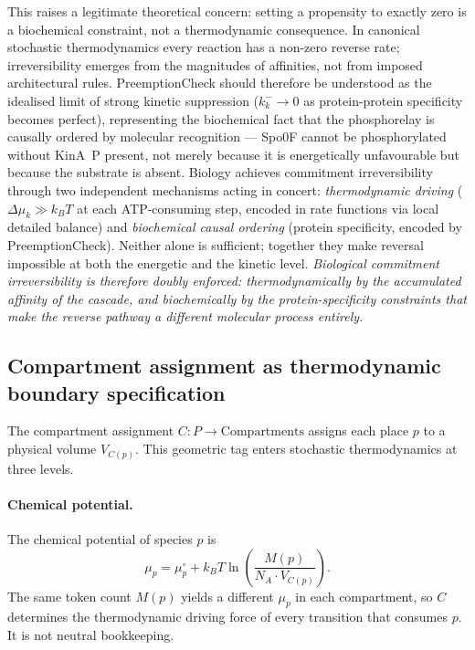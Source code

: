 \documentclass[11pt,a4paper]{article}
\begin{document}
This raises a legitimate theoretical concern: setting a propensity to
exactly zero is a biochemical constraint, not a thermodynamic consequence.
In canonical stochastic thermodynamics every reaction has a non-zero
reverse rate; irreversibility emerges from the magnitudes of affinities,
not from imposed architectural rules.
PreemptionCheck should therefore be understood as the idealised limit of
strong kinetic suppression ($k^-_k \to 0$ as protein-protein specificity
becomes perfect), representing the biochemical fact that the phosphorelay
is causally ordered by molecular recognition --- Spo0F cannot be
phosphorylated without KinA~P present, not merely because it is
energetically unfavourable but because the substrate is absent.
Biology achieves commitment irreversibility through two independent
mechanisms acting in concert: \emph{thermodynamic driving}
($\Delta\mu_k \gg k_BT$ at each ATP-consuming step, encoded in rate
functions via local detailed balance) and \emph{biochemical causal
ordering} (protein specificity, encoded by PreemptionCheck).
Neither alone is sufficient; together they make reversal impossible at
both the energetic and the kinetic level.
\emph{Biological commitment irreversibility is therefore doubly enforced:
thermodynamically by the accumulated affinity of the cascade, and
biochemically by the protein-specificity constraints that make the
reverse pathway a different molecular process entirely.}

\subsection{Compartment assignment as thermodynamic boundary specification}
\label{sec:C_thermodynamic}

The compartment assignment $C: P \to \text{Compartments}$ assigns each
place $p$ to a physical volume $V_{C(p)}$.  This geometric tag enters
stochastic thermodynamics at three levels.

\paragraph{Chemical potential.}
The chemical potential of species $p$ is
\begin{equation}
  \mu_p = \mu_p^\circ + k_BT \ln\!\left(\frac{M(p)}{N_A \cdot V_{C(p)}}\right).
  \label{eq:C_chempot}
\end{equation}
The same token count $M(p)$ yields a different $\mu_p$ in each compartment,
so $C$ determines the thermodynamic driving force of every transition that
consumes $p$.  It is not neutral bookkeeping.
\end{document}
